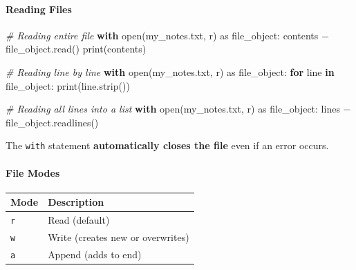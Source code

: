 \documentclass[
  justified,
  openright,
]{tufte-book}
\let\subsection\paragraph
\let\paragraph\paragraph
\newcommand{\KeywordTok}[1]{\textcolor{CodeKeyword}{\textbf{#1}}}  %
\newcommand{\StringTok}[1]{\textcolor{CodeString}{#1}}              %
\newcommand{\CommentTok}[1]{\textcolor{CodeComment}{\textit{#1}}}  %
\newcommand{\CodeAccentTok}[1]{\textcolor{CodeAccent}{#1}}          %
\newcommand{\OperatorTok}[1]{\textcolor{DarkGray}{#1}}              %
\newenvironment{Shaded}{%
  \begin{mdframed}[style=TufteCode]%
}{%
  \end{mdframed}%
}
\let\subsection\paragraph
\let\paragraph\paragraph
\begin{document}
\subsection{Reading Files}\label{reading-files}

\begin{Shaded}
\begin{Highlighting}[]
\CommentTok{\# Reading entire file}
\KeywordTok{with} open(\StringTok{\textquotesingle{}my\_notes.txt\textquotesingle{}}, \StringTok{\textquotesingle{}r\textquotesingle{}}) \CodeAccentTok{as} file\_object:
    contents \OperatorTok{=} file\_object.read()
print(contents)
 
\CommentTok{\# Reading line by line}
\KeywordTok{with} open(\StringTok{\textquotesingle{}my\_notes.txt\textquotesingle{}}, \StringTok{\textquotesingle{}r\textquotesingle{}}) \CodeAccentTok{as} file\_object:
    \KeywordTok{for} line \KeywordTok{in} file\_object:
        print(line.strip())
 
\CommentTok{\# Reading all lines into a list}
\KeywordTok{with} open(\StringTok{\textquotesingle{}my\_notes.txt\textquotesingle{}}, \StringTok{\textquotesingle{}r\textquotesingle{}}) \CodeAccentTok{as} file\_object:
    lines \OperatorTok{=} file\_object.readlines()
\end{Highlighting}
\end{Shaded}

The \texttt{with} statement \textbf{automatically closes the file} even
if an error occurs.

\subsection{File Modes}\label{file-modes}

\begin{fullwidth}{\def\LTcaptype{none} %
\begin{longtable}[]{@{}ll@{}}
\toprule\noalign{}
Mode & Description \\
\midrule\noalign{}
\endhead
\bottomrule\noalign{}
\endlastfoot
\texttt{\textquotesingle{}r\textquotesingle{}} & Read (default) \\
\texttt{\textquotesingle{}w\textquotesingle{}} & Write (creates new or
overwrites) \\
\texttt{\textquotesingle{}a\textquotesingle{}} & Append (adds to end) \\
\end{longtable}
}
\end{fullwidth}
\end{document}
